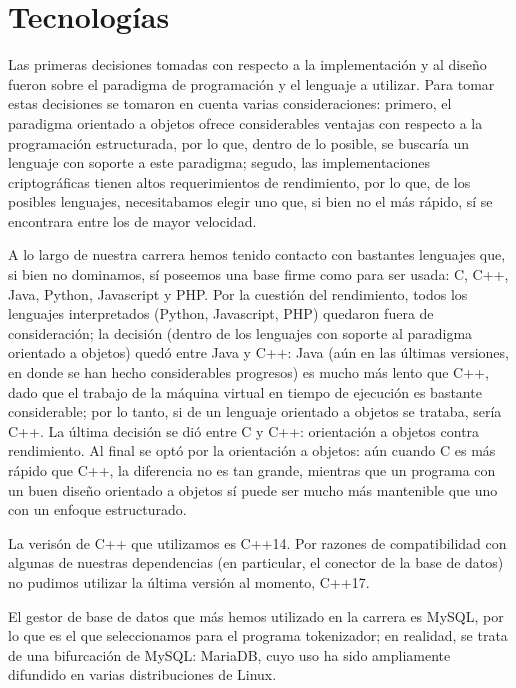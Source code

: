 %
%
%

\section{Tecnologías}
\label{sec:tecnologias}

Las primeras decisiones tomadas con respecto a la implementación y al diseño
fueron sobre el paradigma de programación y el lenguaje a utilizar. Para
tomar estas decisiones se tomaron en cuenta varias consideraciones: primero,
el paradigma orientado a objetos ofrece considerables ventajas con respecto
a la programación estructurada, por lo que, dentro de lo posible, se buscaría
un lenguaje con soporte a este paradigma; segudo, las implementaciones
criptográficas tienen altos requerimientos de rendimiento, por lo que, de los
posibles lenguajes, necesitabamos elegir uno que, si bien no el más rápido,
sí se encontrara entre los de mayor velocidad.

A lo largo de nuestra carrera hemos tenido contacto con bastantes lenguajes que,
si bien no dominamos, sí poseemos una base firme como para ser usada: C, C++,
Java, Python, Javascript y PHP. Por la cuestión del rendimiento, todos los
lenguajes interpretados (Python, Javascript, PHP) quedaron fuera de
consideración; la decisión (dentro de los lenguajes con soporte al paradigma
orientado a objetos) quedó entre Java y C++: Java (aún en las últimas versiones,
en donde se han hecho considerables progresos) es mucho más lento que C++,
dado que el trabajo de la máquina virtual en tiempo de ejecución es bastante
considerable; por lo tanto, si de un lenguaje orientado a objetos se trataba,
sería C++. La última decisión se dió entre C y C++: orientación a objetos contra
rendimiento. Al final se optó por la orientación a objetos: aún cuando C es
más rápido que C++, la diferencia no es tan grande, mientras que un programa
con un buen diseño orientado a objetos sí puede ser mucho más mantenible que
uno con un enfoque estructurado.

La verisón de C++ que utilizamos es C++14. Por razones de compatibilidad con
algunas de nuestras dependencias (en particular, el conector de la base de
datos) no pudimos utilizar la última versión al momento, C++17.

El gestor de base de datos que más hemos utilizado en la carrera es MySQL,
por lo que es el que seleccionamos para el programa tokenizador; en realidad,
se trata de una bifurcación de MySQL: MariaDB, cuyo uso ha sido ampliamente
difundido en varias distribuciones de Linux.

